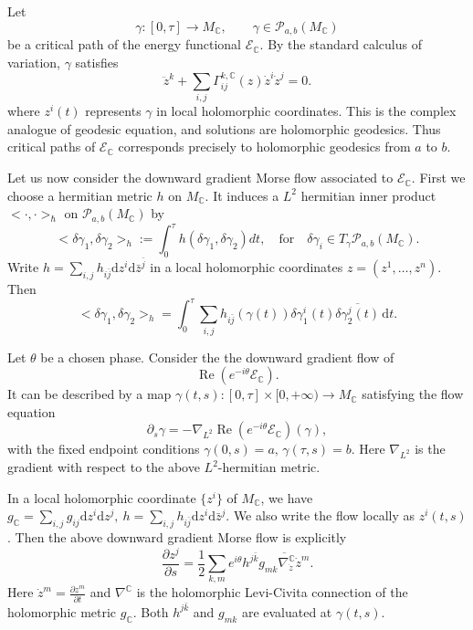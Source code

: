 \documentclass[11pt]{amsart}
\theoremstyle{plain}
\theoremstyle{definition}
\newcommand{\C}{\mathbb{C}}
\newcommand{\dd}{\mathrm d}
\newcommand{\PP}{\mathcal{P}}
\DeclareMathOperator{\re}{Re}
\begin{document}
Let
$$
\gamma: [0,\tau]\to M_{\C}, \qquad \gamma \in \PP_{a,b}(M_{\C})
$$
be a critical path of the energy functional $\mathcal E_{\C}$. By the standard calculus of variation, $\gamma$ satisfies 
\[
\ddot z^k+\sum_{i,j}\Gamma^{k,\C}_{ij}(z)\dot z^i\dot z^j=0.
\]
where $z^i(t)$ represents $\gamma$ in local holomorphic coordinates. This is the complex analogue of geodesic equation, and solutions are holomorphic geodesics. Thus critical paths of $\mathcal E_{\C}$ corresponds precisely to holomorphic geodesics from $a$ to $b$. 


Let us now consider the downward gradient Morse flow associated to $\mathcal E_{\C}$. First we choose a hermitian metric $h$ on $M_\C$. It induces a $L^2$ hermitian inner product $<\cdot,\cdot>_\hbar$ on $\mathcal P_{a,b}(M_{\C})$ by 
$$
<\delta \gamma_1, \delta \gamma_2>_h:=\int_0^\tau h(\delta \gamma_1, \delta \gamma_2) dt, \quad  \text{for}\quad \delta \gamma_i\in T_\gamma\mathcal P_{a,b}(M_{\C}).
$$
Write
$
h=\sum\limits_{i,j}h_{i\bar j}\dd z^i \dd\bar z^{\bar j}
$ in a local holomorphic coordinates $z=(z^1,\ldots,z^n)$.  Then 
$$
<\delta \gamma_1, \delta \gamma_2>_h=\int_0^\tau \sum_{i,j} h_{i\bar j}(\gamma(t))\delta \gamma_1^i(t) \overline{\delta \gamma^{j}_2(t)}\,\dd t. 
$$

Let $\theta$ be a chosen phase. Consider the the downward gradient flow of 
$$
\re(e^{-i\theta}\mathcal E_\C). 
$$
It can be described by a map $\gamma(t, s): [0,\tau] \times [0,+\infty) \to M_{\C}$ satisfying the flow equation 
\[\partial_s\gamma=-\nabla_{L^2}\re(e^{-i\theta}\mathcal E_\C)(\gamma),\]
with the fixed endpoint conditions $\gamma(0,s)=a,\,\gamma(\tau,s)=b$. Here $\nabla_{L^2}$ is the gradient with respect to the above $L^2$-hermitian metric. 


In a local holomorphic coordinate $\{z^i\}$ of $M_{\C}$, we have 
$
g_{\C}=\sum\limits_{i,j}g_{ij}\dd z^i \dd z^j,  \ h=\sum\limits_{i,j}h_{i\bar j}\dd z^i \dd\bar z^j. 
$
We also write the flow locally as $z^i(t,s)$. Then the above downward gradient Morse flow is explicitly 
\begin{equation*}
\frac{\partial z^j}{\partial s}=\frac{1}{2}\sum_{k,m}e^{i\theta}h^{j\bar k}\overline{g_{mk}\nabla^{\C}_{\dot z}\dot z^m}.
\end{equation*}
Here $\dot z^m=\frac{\partial z^m}{\partial t}$ and $\nabla^{\C}$ is the holomorphic Levi-Civita connection of the holomorphic metric $g_\C$. Both $h^{j\bar k}$ and $g_{mk}$ are evaluated at $\gamma(t,s)$.
\end{document}

